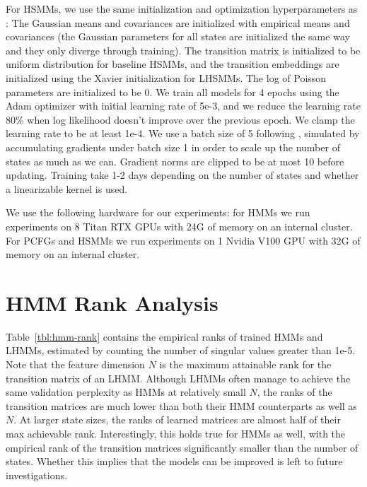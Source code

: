 \documentclass{article}
\begin{document}
For HSMMs, we use the same initialization and optimization hyperparameters as \citet{fried2020learning}: The Gaussian means and covariances are initialized with empirical means and covariances (the Gaussian parameters for all states are initialized the same way and they only diverge through training). The transition matrix is initialized to be uniform distribution for baseline HSMMs, and the transition embeddings are initialized using the Xavier initialization for LHSMMs. The log of Poisson parameters are initialized to be 0. We train all models for 4 epochs using the Adam optimizer with initial learning rate of 5e-3, and we reduce the learning rate 80\% when log likelihood doesn't improve over the previous epoch. We clamp the learning rate to be at least 1e-4. We use a batch size of 5 following \citet{fried2020learning}, simulated by accumulating gradients under batch size 1 in order to scale up the number of states as much as we can. Gradient norms are clipped to be at most 10 before updating. Training take 1-2 days depending on the number of states and whether a linearizable kernel is used.


We use the following hardware for our experiments: for HMMs we run experiments on 8 Titan RTX GPUs with 24G of memory on an internal cluster. For PCFGs and HSMMs we run experiments on 1 Nvidia V100 GPU with 32G of memory on an internal cluster.

\section{HMM Rank Analysis}
\label{sec:rank}

Table~\ref{tbl:hmm-rank} contains the empirical ranks of trained HMMs and LHMMs, estimated by counting the number of singular values greater than 1e-5. Note that the feature dimension $N$ is the maximum attainable rank for the transition matrix of an LHMM. Although LHMMs often manage to achieve the same validation perplexity as HMMs at relatively small $N$, the ranks of the transition matrices are much lower than both their HMM counterparts as well as $N$.
At larger state sizes, the ranks of learned matrices are almost half of their max achievable rank. Interestingly, this holds true for HMMs as well, with the empirical rank of the transition matrices significantly smaller than the number of states. Whether this implies that the models can be improved is left to future investigations.
\end{document}
